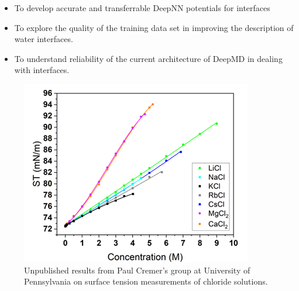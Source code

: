 \begin{itemize}
    \item To develop accurate and transferrable DeepNN potentials for
          interfaces
    \item To explore the quality of the training data set in improving the
          description of water interfaces.
    \item To understand reliability of the current architecture of DeepMD in
          dealing with interfaces.
\end{itemize}

\begin{figure}[tbhp!]
    \centering
    \includegraphics[width=0.75\linewidth]{images/ST_solute.png}
    \caption{Unpublished results from Paul Cremer's group at University of
        Pennsylvania  on surface tension measurements of chloride solutions.}
    \label{fig:surf_tens_solute}
\end{figure}